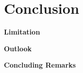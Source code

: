 \chapter{Conclusion}\label{chap:conclusion}

{\noindent\bfseries Limitation }

{\noindent\bfseries Outlook }

{\noindent\bfseries Concluding Remarks }
